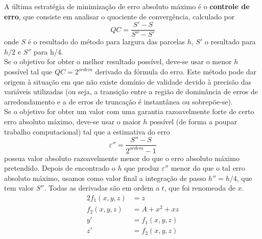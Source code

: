 \documentclass{mnum}
\begin{document}
A última estratégia de minimização de erro absoluto máximo é o \textbf{controle de erro}, que consiste em analisar o quociente de convergência, calculado por
\begin{equation*}
	QC=\frac{S'-S}{S''-S'}
\end{equation*}
onde $S$ é o resultado do método para largura das parcelas $h$, $S'$ o resultado para $h/2$ e $S''$ para h/4.\\ Se o objetivo for obter o melhor resultado possível, deve-se usar o menor $h$ possível tal que $QC = 2^{ordem}$ derivado da fórmula do erro. Este método pode dar origem à situação em que não existe domínio de validade devido à precisão das variáveis utilizadas (ou seja, a transição entre a região de dominância de erros de arredondamento e a de erros de truncação é instantânea ou sobrepõe-se).\\
Se o objetivo for obter um valor com uma garantia razoavelmente forte de certo erro absoluto máximo, deve-se usar o maior $h$ possível (de forma a poupar trabalho computacional) tal que a estimativa do erro
\begin{equation*}
\varepsilon '' = \frac{S''-S}{2^{ordem}-1}
\end{equation*}
possua valor absoluto razoavelmente menor do que o erro absoluto máximo pretendido. Depois de encontrado o $h$ que produz $\varepsilon ''$ menor do que o tal erro absoluto máximo, usamos como valor final a integração de passo $h''=h/4$, que tem valor $S''$.
Todas as derivadas são em ordem a $t$, que foi renomeada de $x$.
\begin{alignat*}{2}
	f_1(x,y,z)&=z\\	
	f_2(x,y,z)&=A+x^2+xz\\	
	y'&=f_1(x,y,z)\\	
	z'&=f_2(x,y,z)
\end{alignat*}
%
\end{document}
